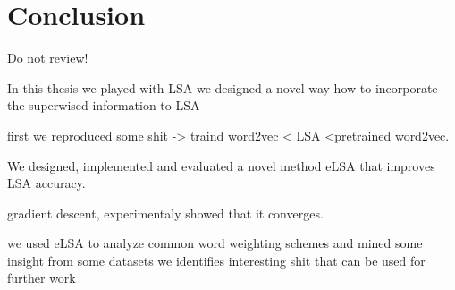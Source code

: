 \chapter*{Conclusion}

\* Do not review!

In this thesis we played with LSA
we designed a novel way how to incorporate the superwised information to LSA

first we reproduced some shit -> traind word2vec < LSA <pretrained word2vec.

We designed, implemented and evaluated a novel method eLSA 
that improves LSA accuracy.


gradient descent, experimentaly showed that it converges.

we used eLSA to analyze common word weighting schemes and mined some insight from some datasets
we identifies interesting shit that can be used for further work

\*